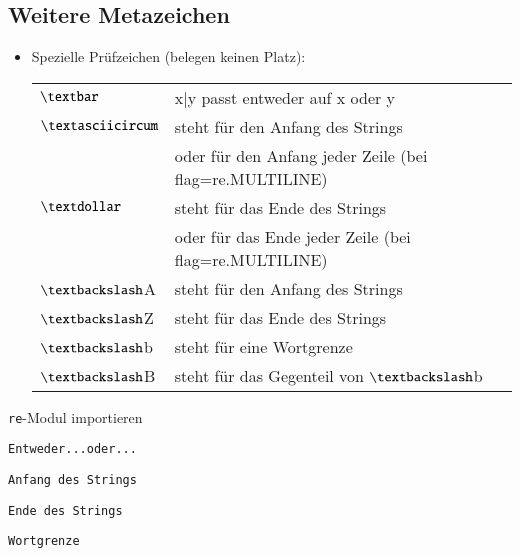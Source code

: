 \subsection{Weitere Metazeichen}
\begin{itemize}
	\item Spezielle Prüfzeichen (belegen keinen Platz):\\
	\begin{tabular}{ll}
		$\textbar$& x|y passt entweder auf x oder y\\
		$\textasciicircum$& steht für den Anfang des Strings\\
		& oder für den Anfang jeder Zeile (bei flag=re.MULTILINE)\\
		$\textdollar$& steht für das Ende des Strings\\
		& oder für das Ende jeder Zeile (bei flag=re.MULTILINE)\\
		$\textbackslash$A& steht für den Anfang des Strings\\
		$\textbackslash$Z& steht für das Ende des Strings\\
		$\textbackslash$b& steht für eine Wortgrenze\\
		$\textbackslash$B& steht für das Gegenteil von $\textbackslash$b\\
	\end{tabular}
\end{itemize}
\texttt{re}-Modul importieren

\texttt{Entweder...oder...}

\texttt{Anfang des Strings}

\texttt{Ende des Strings}

\texttt{Wortgrenze}


